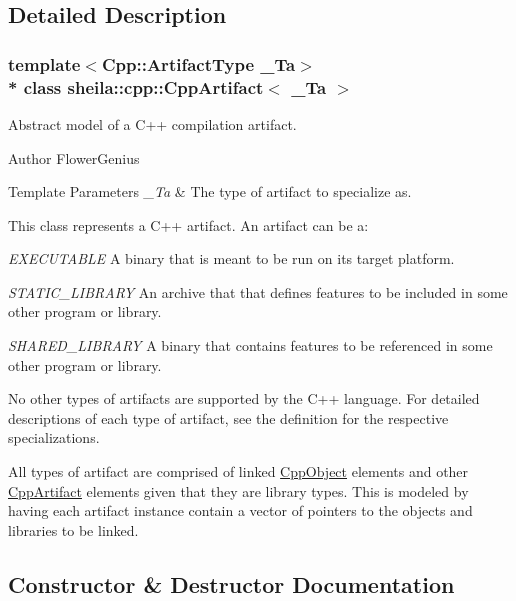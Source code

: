 \subsection{Detailed Description}
\subsubsection*{template$<$Cpp\+::\+Artifact\+Type \+\_\+\+Ta$>$\\*
class sheila\+::cpp\+::\+Cpp\+Artifact$<$ \+\_\+\+Ta $>$}

Abstract model of a C++ compilation artifact. 

\begin{DoxyAuthor}{Author}
Flower\+Genius 
\end{DoxyAuthor}

\begin{DoxyTemplParams}{Template Parameters}
{\em \+\_\+\+Ta} & The type of artifact to specialize as.\\
\hline
\end{DoxyTemplParams}
This class represents a C++ artifact. An artifact can be a\+:

\begin{DoxyItemize}
\item {\itshape E\+X\+E\+C\+U\+T\+A\+B\+LE} A binary that is meant to be run on it\textquotesingle{}s target platform. \item {\itshape S\+T\+A\+T\+I\+C\+\_\+\+L\+I\+B\+R\+A\+RY} An archive that that defines features to be included in some other program or library. \item {\itshape S\+H\+A\+R\+E\+D\+\_\+\+L\+I\+B\+R\+A\+RY} A binary that contains features to be referenced in some other program or library.\end{DoxyItemize}
No other types of artifacts are supported by the C++ language. For detailed descriptions of each type of artifact, see the definition for the respective specializations.

All types of artifact are comprised of linked {\ttfamily \hyperlink{classsheila_1_1cpp_1_1CppObject}{Cpp\+Object}} elements and other {\ttfamily \hyperlink{classsheila_1_1cpp_1_1CppArtifact}{Cpp\+Artifact}} elements given that they are library types. This is modeled by having each artifact instance contain a vector of pointers to the objects and libraries to be linked. 

\subsection{Constructor \& Destructor Documentation}
